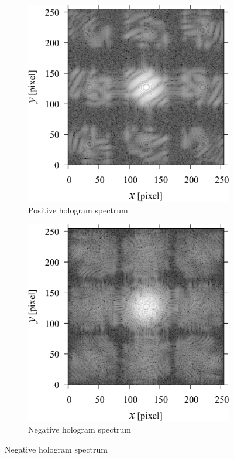 \begin{figure}[H]
    \begin{subfigure}[t]{0.45\linewidth}
        \includegraphics[width=\linewidth]{./Figure/3_Methods/fftclose1.pdf}
        \caption{Positive hologram spectrum}
        \label{fig:trainingData:posispec}
    \end{subfigure}
    \hfill
    \begin{subfigure}[t]{0.45\linewidth}
        \includegraphics[width=\linewidth]{./Figure/3_Methods/fftfar1.pdf}
        \caption{Negative hologram spectrum}
        \label{fig:trainingData:negaspec}
    \end{subfigure}


\end{figure}

